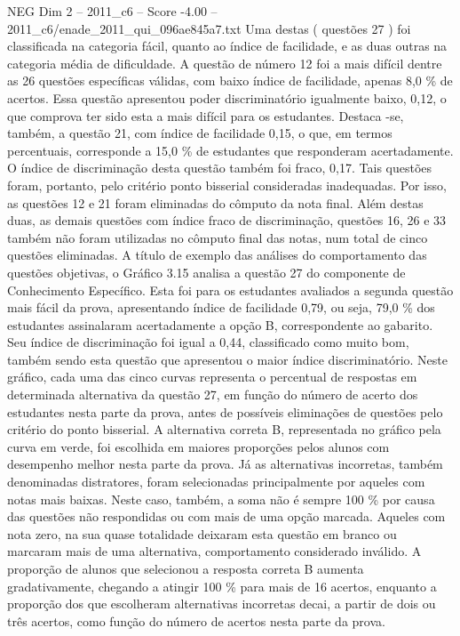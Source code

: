 \begin{textsample}{NEG Dim 2 – 2011\_c6 – Score -4.00 – 2011\_c6/enade\_2011\_qui\_096ae845a7.txt}
Uma destas ( questões 27 ) foi classificada na categoria fácil, quanto ao índice de facilidade, e as duas outras na categoria média de dificuldade.
A questão de número 12 foi a mais difícil dentre as 26 questões específicas válidas, com baixo índice de facilidade, apenas 8,0 \% de acertos.
Essa questão apresentou poder discriminatório igualmente baixo, 0,12, o que comprova ter sido esta a mais difícil para os estudantes.
Destaca -se, também, a questão 21, com índice de facilidade 0,15, o que, em termos percentuais, corresponde a 15,0 \% de estudantes que responderam acertadamente.
O índice de discriminação desta questão também foi fraco, 0,17.
Tais questões foram, portanto, pelo critério ponto bisserial consideradas inadequadas.
Por isso, as questões 12 e 21 foram eliminadas do cômputo da nota final.
Além destas duas, as demais questões com índice fraco de discriminação, questões 16, 26 e 33 também não foram utilizadas no cômputo final das notas, num total de cinco questões eliminadas.
A título de exemplo das análises do comportamento das questões objetivas, o Gráfico 3.15 analisa a questão 27 do componente de Conhecimento Específico.
Esta foi para os estudantes avaliados a segunda questão mais fácil da prova, apresentando índice de facilidade 0,79, ou seja, 79,0 \% dos estudantes assinalaram acertadamente a opção B, correspondente ao gabarito.
Seu índice de discriminação foi igual a 0,44, classificado como muito bom, também sendo esta questão que apresentou o maior índice discriminatório.
Neste gráfico, cada uma das cinco curvas representa o percentual de respostas em determinada alternativa da questão 27, em função do número de acerto dos estudantes nesta parte da prova, antes de possíveis eliminações de questões pelo critério do ponto bisserial.
A alternativa correta B, representada no gráfico pela curva em verde, foi escolhida em maiores proporções pelos alunos com desempenho melhor nesta parte da prova.
Já as alternativas incorretas, também denominadas distratores, foram selecionadas principalmente por aqueles com notas mais baixas.
Neste caso, também, a soma não é sempre 100 \% por causa das questões não respondidas ou com mais de uma opção marcada.
Aqueles com nota zero, na sua quase totalidade deixaram esta questão em branco ou marcaram mais de uma alternativa, comportamento considerado inválido.
A proporção de alunos que selecionou a resposta correta B aumenta gradativamente, chegando a atingir 100 \% para mais de 16 acertos, enquanto a proporção dos que escolheram alternativas incorretas decai, a partir de dois ou três acertos, como função do número de acertos nesta parte da prova.

\end{textsample}
